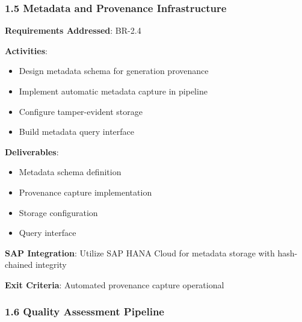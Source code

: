 \subsubsection{1.5 Metadata and Provenance Infrastructure}

\begin{tcolorbox}[colback=blue!5,colframe=blue!70,title=1.5 Provenance System]
\textbf{Requirements Addressed}: BR-2.4

\textbf{Activities}:
\begin{itemize}
  \item Design metadata schema for generation provenance
  \item Implement automatic metadata capture in pipeline
  \item Configure tamper-evident storage
  \item Build metadata query interface
\end{itemize}

\textbf{Deliverables}:
\begin{itemize}
  \item Metadata schema definition
  \item Provenance capture implementation
  \item Storage configuration
  \item Query interface
\end{itemize}

\textbf{SAP Integration}: Utilize SAP HANA Cloud for metadata storage with
hash-chained integrity

\textbf{Exit Criteria}: Automated provenance capture operational
\end{tcolorbox}

\subsubsection{1.6 Quality Assessment Pipeline}

